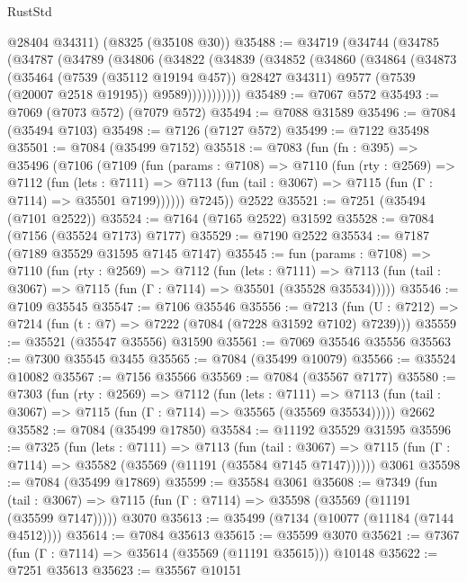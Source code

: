 \begin{lexlean}{RustStd}
\begin{coremodule}
      @28404
      @34311)
    (@8325 (@35108 @30))
@35488 := @34719
    (@34744
      (@34785
        (@34787
          (@34789
            (@34806
              (@34822
                (@34839
                  (@34852
                    (@34860
                      (@34864
                        (@34873
                          (@35464 (@7539 (@35112 @19194 @457)) @28427 @34311)
                          @9577
                          (@7539 (@20007 @2518 @19195))
                          @9589)))))))))))
@35489 := @7067 @572
@35493 := @7069 (@7073 @572) (@7079 @572)
@35494 := @7088 @31589
@35496 := @7084 (@35494 @7103)
@35498 := @7126 (@7127 @572)
@35499 := @7122 @35498
@35501 := @7084 (@35499 @7152)
@35518 := @7083
    (fun (fn : @395) =>
    @35496
      (@7106
        (@7109
          (fun (params : @7108) =>
          @7110
            (fun (rty : @2569) =>
            @7112
              (fun (lets : @7111) =>
              @7113 (fun (tail : @3067) => @7115 (fun (Γ : @7114) => @35501 @7199))))))
        @7245))
    @2522
@35521 := @7251 (@35494 (@7101 @2522))
@35524 := @7164 (@7165 @2522) @31592
@35528 := @7084 (@7156 (@35524 @7173) @7177)
@35529 := @7190 @2522
@35534 := @7187 (@7189 @35529 @31595 @7145 @7147)
@35545 := fun (params : @7108) =>
  @7110
    (fun (rty : @2569) =>
    @7112
      (fun (lets : @7111) =>
      @7113 (fun (tail : @3067) => @7115 (fun (Γ : @7114) => @35501 (@35528 @35534)))))
@35546 := @7109 @35545
@35547 := @7106 @35546
@35556 := @7213
    (fun (U : @7212) => @7214 (fun (t : @7) => @7222 (@7084 (@7228 @31592 @7102) @7239)))
@35559 := @35521 (@35547 @35556) @31590
@35561 := @7069 @35546 @35556
@35563 := @7300 @35545 @3455
@35565 := @7084 (@35499 @10079)
@35566 := @35524 @10082
@35567 := @7156 @35566
@35569 := @7084 (@35567 @7177)
@35580 := @7303
    (fun (rty : @2569) =>
    @7112
      (fun (lets : @7111) =>
      @7113 (fun (tail : @3067) => @7115 (fun (Γ : @7114) => @35565 (@35569 @35534)))))
    @2662
@35582 := @7084 (@35499 @17850)
@35584 := @11192 @35529 @31595
@35596 := @7325
    (fun (lets : @7111) =>
    @7113
      (fun (tail : @3067) =>
      @7115 (fun (Γ : @7114) => @35582 (@35569 (@11191 (@35584 @7145 @7147))))))
    @3061
@35598 := @7084 (@35499 @17869)
@35599 := @35584 @3061
@35608 := @7349
    (fun (tail : @3067) => @7115 (fun (Γ : @7114) => @35598 (@35569 (@11191 (@35599 @7147)))))
    @3070
@35613 := @35499 (@7134 (@10077 (@11184 (@7144 @4512))))
@35614 := @7084 @35613
@35615 := @35599 @3070
@35621 := @7367 (fun (Γ : @7114) => @35614 (@35569 (@11191 @35615))) @10148
@35622 := @7251 @35613
@35623 := @35567 @10151

\end{coremodule}
\end{lexlean}
